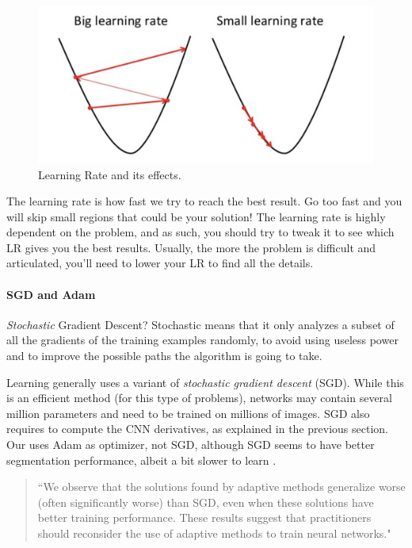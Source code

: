 \begin{figure}[H]
	\centering
	\includegraphics[width=.75\linewidth]{images/learningrate}
	\caption{Learning Rate and its effects.}
	\label{f:learningrate}
\end{figure}

The learning rate is how fast we try to reach the best result. Go too fast and you will skip small regions that could be your solution! The learning rate is highly dependent on the problem, and as such, you should try to tweak it to see which LR gives you the best results. Usually, the more the problem is difficult and articulated, you'll need to lower your LR to find all the details.

\paragraph{SGD and Adam}\label{s:trainalg-opt-sgdadam}

\emph{Stochastic} Gradient Descent? Stochastic means that it only analyzes a subset of all the gradients of the training examples randomly, to avoid using useless power and to improve the possible paths the algorithm is going to take.

Learning generally uses a variant of \emph{stochastic gradient descent} (SGD). While this is an efficient method (for this type of problems), networks may contain several million parameters and need to be trained on millions of images. SGD also requires to compute the CNN derivatives, as explained in the previous section. Our \maskrcnn uses Adam as optimizer, not SGD, although SGD seems to have better segmentation performance, albeit a bit slower to learn \cite{wilson2017marginal}.
\begin{quotation}“We observe that the solutions found by adaptive methods generalize worse (often significantly worse) than SGD, even when these solutions have better training performance. These results suggest that practitioners should reconsider the use of adaptive methods to train neural networks."
\end{quotation}

